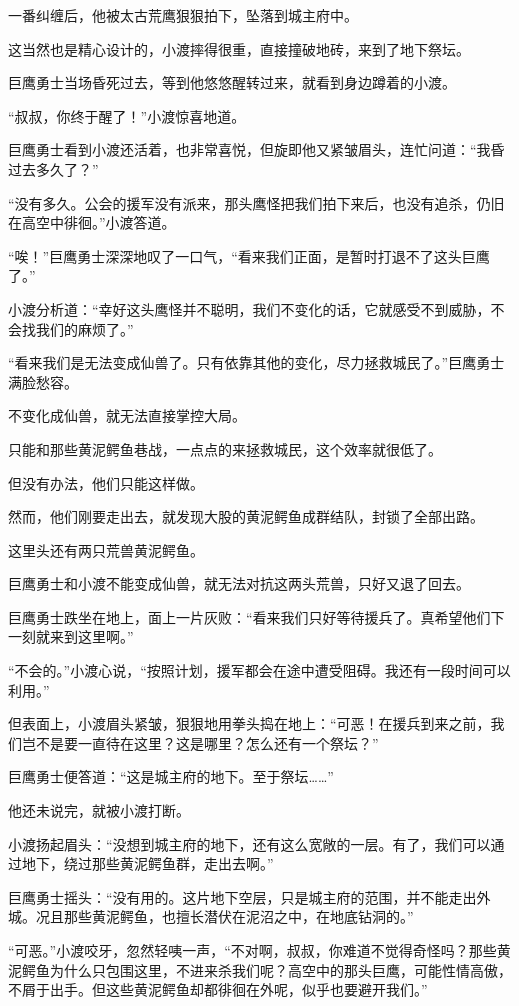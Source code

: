 \begin{this_body}
一番纠缠后，他被太古荒鹰狠狠拍下，坠落到城主府中。

这当然也是精心设计的，小渡摔得很重，直接撞破地砖，来到了地下祭坛。

巨鹰勇士当场昏死过去，等到他悠悠醒转过来，就看到身边蹲着的小渡。

“叔叔，你终于醒了！”小渡惊喜地道。

巨鹰勇士看到小渡还活着，也非常喜悦，但旋即他又紧皱眉头，连忙问道：“我昏过去多久了？”

“没有多久。公会的援军没有派来，那头鹰怪把我们拍下来后，也没有追杀，仍旧在高空中徘徊。”小渡答道。

“唉！”巨鹰勇士深深地叹了一口气，“看来我们正面，是暂时打退不了这头巨鹰了。”

小渡分析道：“幸好这头鹰怪并不聪明，我们不变化的话，它就感受不到威胁，不会找我们的麻烦了。”

“看来我们是无法变成仙兽了。只有依靠其他的变化，尽力拯救城民了。”巨鹰勇士满脸愁容。

不变化成仙兽，就无法直接掌控大局。

只能和那些黄泥鳄鱼巷战，一点点的来拯救城民，这个效率就很低了。

但没有办法，他们只能这样做。

然而，他们刚要走出去，就发现大股的黄泥鳄鱼成群结队，封锁了全部出路。

这里头还有两只荒兽黄泥鳄鱼。

巨鹰勇士和小渡不能变成仙兽，就无法对抗这两头荒兽，只好又退了回去。

巨鹰勇士跌坐在地上，面上一片灰败：“看来我们只好等待援兵了。真希望他们下一刻就来到这里啊。”

“不会的。”小渡心说，“按照计划，援军都会在途中遭受阻碍。我还有一段时间可以利用。”

但表面上，小渡眉头紧皱，狠狠地用拳头捣在地上：“可恶！在援兵到来之前，我们岂不是要一直待在这里？这是哪里？怎么还有一个祭坛？”

巨鹰勇士便答道：“这是城主府的地下。至于祭坛……”

他还未说完，就被小渡打断。

小渡扬起眉头：“没想到城主府的地下，还有这么宽敞的一层。有了，我们可以通过地下，绕过那些黄泥鳄鱼群，走出去啊。”

巨鹰勇士摇头：“没有用的。这片地下空层，只是城主府的范围，并不能走出外城。况且那些黄泥鳄鱼，也擅长潜伏在泥沼之中，在地底钻洞的。”

“可恶。”小渡咬牙，忽然轻咦一声，“不对啊，叔叔，你难道不觉得奇怪吗？那些黄泥鳄鱼为什么只包围这里，不进来杀我们呢？高空中的那头巨鹰，可能性情高傲，不屑于出手。但这些黄泥鳄鱼却都徘徊在外呢，似乎也要避开我们。”


\end{this_body}
